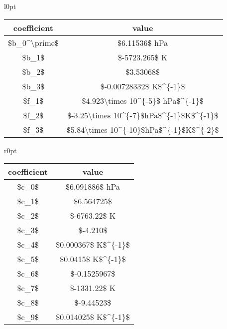 \documentclass[
]{book}
\begin{document}
\begin{table}
\begin{wraptable}{l}{0pt}
\begin{tabular}[c]{c|c}
\hline
coefficient & value\\
\hline
\$b\_0\textasciicircum{}\textbackslash{}prime\$ & \$6.11536\$ hPa\\
\hline
\$b\_1\$ & \$-5723.265\$ K\\
\hline
\$b\_2\$ & \$3.53068\$\\
\hline
\$b\_3\$ & \$-0.00728332\$ K\$\textasciicircum{}\{-1\}\$\\
\hline
\$f\_1\$ & \$4.923\textbackslash{}times 10\textasciicircum{}\{-5\}\$ hPa\$\textasciicircum{}\{-1\}\$\\
\hline
\$f\_2\$ & \$-3.25\textbackslash{}times 10\textasciicircum{}\{-7\}\$hPa\$\textasciicircum{}\{-1\}\$K\$\textasciicircum{}\{-1\}\$\\
\hline
\$f\_3\$ & \$5.84\textbackslash{}times 10\textasciicircum{}\{-10\}\$hPa\$\textasciicircum{}\{-1\}\$K\$\textasciicircum{}\{-2\}\$\\
\hline
\end{tabular}\end{wraptable}\begin{wraptable}{r}{0pt}
\begin{tabular}[c]{c|c}
\hline
coefficient & value\\
\hline
\$c\_0\$ & \$6.091886\$ hPa\\
\hline
\$c\_1\$ & \$6.564725\$\\
\hline
\$c\_2\$ & \$-6763.22\$ K\\
\hline
\$c\_3\$ & \$-4.210\$\\
\hline
\$c\_4\$ & \$0.000367\$ K\$\textasciicircum{}\{-1\}\$\\
\hline
\$c\_5\$ & \$0.0415\$ K\$\textasciicircum{}\{-1\}\$\\
\hline
\$c\_6\$ & \$-0.1525967\$\\
\hline
\$c\_7\$ & \$-1331.22\$ K\\
\hline
\$c\_8\$ & \$-9.44523\$\\
\hline
\$c\_9\$ & \$0.014025\$ K\$\textasciicircum{}\{-1\}\$\\
\hline
\end{tabular}\end{wraptable}
\end{table}
\end{document}
